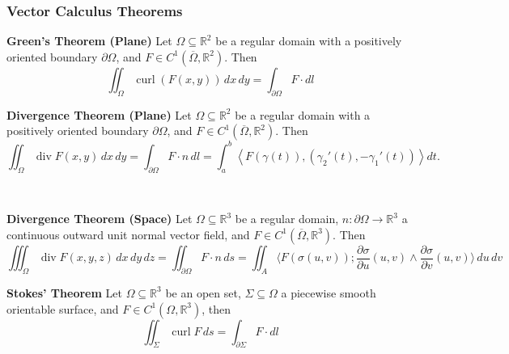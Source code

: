 \documentclass[8pt]{article}
\begin{document}
\subsubsection*{Vector Calculus Theorems}
\begin{minipage}[htp]{0.49\textwidth}
\noindent\textbf{Green's Theorem (Plane)}
Let \( \Omega \subseteq \mathbb{R}^2 \) be a regular domain with a positively oriented boundary \( \partial \Omega \), and \( F \in C^1(\overline{\Omega}, \mathbb{R}^2) \). Then
\vspace{-10px}\[
\iint_{\Omega} \operatorname{curl}(F(x, y)) \, dx \, dy = \int_{\partial \Omega} F \cdot dl
\]
\end{minipage}
\hfill
\begin{minipage}[htp]{0.49\textwidth}
\noindent\textbf{Divergence Theorem (Plane)}
Let \( \Omega \subseteq \mathbb{R}^2 \) be a regular domain with a positively oriented boundary \( \partial \Omega \), and \( F \in C^1(\overline{\Omega}, \mathbb{R}^2) \). Then
\vspace{-10px}\[
\iint_{\Omega} \operatorname{div} F(x, y) \, dx \, dy = \int_{\partial \Omega} F \cdot n \, dl = \int_a^b \left\langle F(\gamma(t)), (\gamma_2'(t), -\gamma_1'(t)) \right\rangle dt.
\]\vspace{-10px}
\end{minipage}
\\
\begin{minipage}[htp]{0.49\textwidth}
\noindent\textbf{Divergence Theorem (Space)}
Let \( \Omega \subseteq \mathbb{R}^3 \) be a regular domain, \( n : \partial \Omega \to \mathbb{R}^3 \) a continuous outward unit normal vector field, and \( F \in C^1(\overline{\Omega}, \mathbb{R}^3) \). Then
\[
\iiint_{\Omega} \operatorname{div} F(x,y,z) \, dx \, dy \, dz = \iint_{\partial \Omega} F \cdot n \, ds = \iint_{A} \langle F(\sigma(u,v)); \frac{\partial \sigma}{\partial u}(u,v) \wedge \frac{\partial \sigma}{\partial v}(u,v) \rangle \, du \, dv
\]

\end{minipage}
\hfill
\begin{minipage}[htp]{0.49\textwidth}
\noindent\textbf{Stokes' Theorem}
Let \( \Omega \subseteq \mathbb{R}^3 \) be an open set, \( \Sigma \subseteq \Omega \) a piecewise smooth orientable surface, and \( F \in C^1(\Omega, \mathbb{R}^3) \), then
\vspace{-10px}\[
\iint_{\Sigma} \operatorname{curl} F \, ds = \int_{\partial \Sigma} F \cdot dl
\]
\end{minipage}\\
\end{document}
